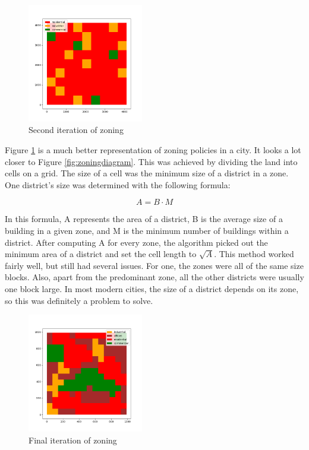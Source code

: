 \documentclass[11pt]{article}
\begin{document}
\begin{multicols}{2}
    \begin{figure}[H]
        \centering
        \vspace{-1em}
        \includegraphics[width=0.45\textwidth]{images/secondzoning.png}
        \caption{Second iteration of zoning}
        \label{fig:second-zoning}
    \end{figure}

    \quad Figure \ref{fig:second-zoning} is a much better representation of zoning policies in a city. It looks a lot closer to Figure \ref{fig:zoningdiagram}. This was achieved by dividing the land into cells on a grid. The size of a cell was the minimum size of a district in a zone. One district's size was determined with the following formula: 

    \[A = B \cdot M\]

    In this formula, A represents the area of a district, B is the average size of a building in a given zone, and M is the minimum number of buildings within a district. After computing A for every zone, the algorithm picked out the minimum area of a district and set the cell length to \(\sqrt{A}\). This method worked fairly well, but still had several issues. For one, the zones were all of the same size blocks. Also, apart from the predominant zone, all the other districts were usually one block large. In most modern cities, the size of a district depends on its zone, so this was definitely a problem to solve.

    \begin{figure}[H]
        \centering
        \vspace{-1em}
        \includegraphics[width=0.45\textwidth]{images/finalzoning.png}
        \caption{Final iteration of zoning}
        \label{fig:final-zoning}
    \end{figure}


\end{multicols}
\end{document}
